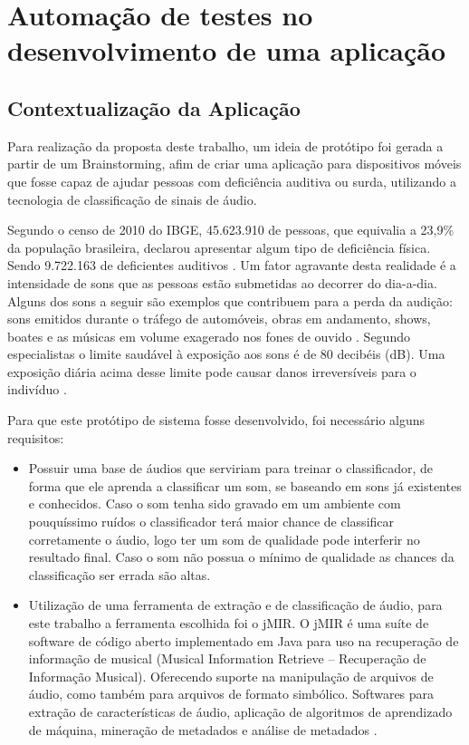 \chapter{Automação de testes no desenvolvimento de uma aplicação}

\section{Contextualização da Aplicação}
Para realização da proposta deste trabalho, um ideia de protótipo foi gerada a partir de um Brainstorming, afim de criar uma aplicação para dispositivos móveis que fosse capaz de ajudar pessoas com deficiência auditiva ou surda, utilizando a tecnologia de classificação de sinais de áudio.

Segundo  o censo de 2010 do IBGE, 45.623.910 de pessoas, que equivalia a 23,9\% da população brasileira, declarou apresentar algum tipo de deficiência física. Sendo 9.722.163 de deficientes auditivos \cite{censo2010}. Um fator agravante desta realidade é a intensidade de sons que as pessoas estão submetidas ao decorrer do dia-a-dia. Alguns dos sons a seguir são exemplos que contribuem para a perda da audição: sons emitidos durante o tráfego de automóveis, obras em andamento, shows, boates e as músicas em volume exagerado nos fones de ouvido \cite{jornalDiaDia}. Segundo especialistas o limite saudável à exposição aos sons é de 80 decibéis (dB). Uma exposição diária acima desse limite pode causar danos irreversíveis para o indivíduo \cite{ruido}.

Para que este protótipo de sistema fosse desenvolvido, foi necessário alguns requisitos: 
\begin{itemize}
	\item Possuir uma base de áudios que serviriam para treinar o classificador, de forma que ele aprenda a classificar um som, se baseando em sons já existentes e conhecidos. Caso o som tenha sido gravado em um ambiente com pouquíssimo ruídos o classificador terá maior chance de classificar corretamente o áudio, logo ter um som de qualidade pode interferir no resultado final. Caso o som não possua o mínimo de qualidade as chances da classificação ser errada são altas. 

	\item Utilização de uma ferramenta de extração e de classificação de áudio, para este trabalho a ferramenta escolhida foi o jMIR. O jMIR é uma suíte de software de código aberto implementado em Java para uso na recuperação de informação de musical (Musical Information Retrieve – Recuperação de Informação Musical). Oferecendo suporte  na manipulação de arquivos de áudio, como também para arquivos de formato simbólico. Softwares para extração de características de áudio, aplicação de algoritmos de aprendizado de máquina, mineração de metadados e análise de metadados \cite{jmir}. 
\end{itemize}

